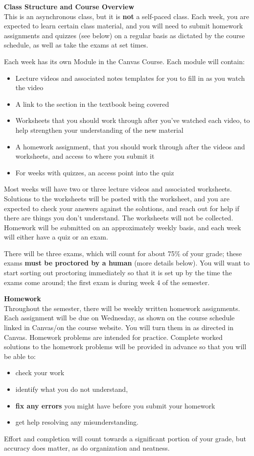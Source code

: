\documentclass[11pt]{article}
\renewcommand{\emph}[1]{\textsf{\textbf{#1}}}
\newcommand{\localhead}[1]{\par\smallskip\textbf{#1} \smallskip\nobreak\\}%
\def\heading#1{\localhead{\large\emph{#1}}}
\begin{document}
\heading{Class Structure and Course Overview}
This is an asynchronous class, but it is \emph{not} a self-paced class. Each week, you are expected to learn certain class material, and you will need to submit homework assignments and quizzes (see below) on a regular basis as dictated by the course schedule, as well as take the exams at set times. 

Each week has its own Module in the Canvas Course. Each module will contain:
\begin{itemize}[noitemsep]
\item Lecture videos and associated notes templates for you to fill in as you watch the video
\item A link to the section in the textbook being covered
\item Worksheets that you should work through after you've watched each video, to help strengthen your understanding of the new material
\item A homework assignment, that you should work through after the videos and worksheets, and access to where you submit it
\item For weeks with quizzes, an access point into the quiz
\end{itemize}

Most weeks will have two or three lecture videos and associated worksheets. Solutions to the worksheets will be posted with the worksheet, and you are expected to check your answers against the solutions, and reach out for help if there are things you don't understand. The worksheets will not be collected. Homework will be submitted on an approximately weekly basis, and each week will either have a quiz or an exam.

There will be three exams, which will count for about 75\% of your grade; these exams \emph{must be proctored by a human} (more details below). You will want to start sorting out proctoring immediately so that it is set up by the time the exams come around; the first exam is during week 4 of the semester.

\heading{Homework}
Throughout the semester, there will be weekly written homework assignments. Each assignment will be
due on Wednesday, as shown on the course schedule linked in Canvas/on the course website. You will turn them in as directed in Canvas. Homework problems are intended for practice. Complete worked solutions to the homework problems will be provided in advance so that you will be able to:
\begin{itemize}[nosep]
\item check your work
\item identify what you do not understand, 
\item \emph{fix any errors} you might have before you submit your homework
\item get help resolving any misunderstanding.
\end{itemize}
Effort and
completion will count towards a significant portion of your grade, but
accuracy does matter, as do organization and neatness. 
\end{document}
